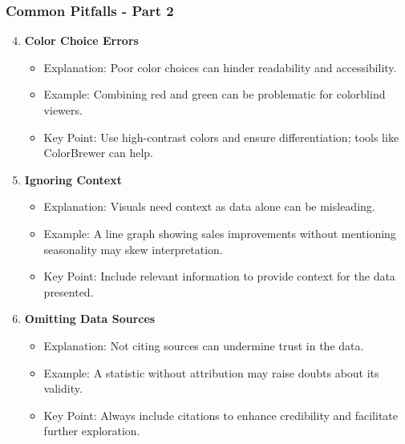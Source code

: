 \documentclass[aspectratio=169]{beamer}
\begin{document}
\begin{frame}[fragile]
    \frametitle{Common Pitfalls - Part 2}
    \begin{enumerate}
        \setcounter{enumi}{3}
        \item \textbf{Color Choice Errors}
            \begin{itemize}
                \item Explanation: Poor color choices can hinder readability and accessibility.
                \item Example: Combining red and green can be problematic for colorblind viewers.
                \item Key Point: Use high-contrast colors and ensure differentiation; tools like ColorBrewer can help.
            \end{itemize}

        \item \textbf{Ignoring Context}
            \begin{itemize}
                \item Explanation: Visuals need context as data alone can be misleading.
                \item Example: A line graph showing sales improvements without mentioning seasonality may skew interpretation.
                \item Key Point: Include relevant information to provide context for the data presented.
            \end{itemize}

        \item \textbf{Omitting Data Sources}
            \begin{itemize}
                \item Explanation: Not citing sources can undermine trust in the data.
                \item Example: A statistic without attribution may raise doubts about its validity.
                \item Key Point: Always include citations to enhance credibility and facilitate further exploration.
            \end{itemize}
    \end{enumerate}
\end{frame}
\end{document}
